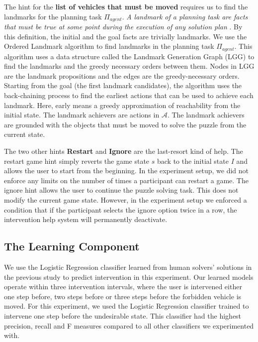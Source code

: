 The hint for the \textbf{list of vehicles that must be moved} requires us to find the landmarks for the planning task $\Pi_{agent}$. \textit{A landmark of a planning task are facts that must be true at some point during the execution of any solution plan} \cite{hoffman2004lm}. By this definition, the initial and the goal facts are trivially landmarks. We use the Ordered Landmark algorithm  to find landmarks in the planning task $\Pi_{agent}$. This algorithm uses a data structure called the Landmark Generation Graph (LGG) to find the landmarks and the greedy necessary orders between them. Nodes in LGG are the landmark propositions and the edges are the greedy-necessary orders. Starting from the goal (the first landmark candidates), the algorithm uses the back-chaining process to find the earliest actions that can be used to achieve each landmark. Here, early means a greedy approximation of reachability from the initial state. The landmark achievers are actions in $\mathcal{A}$. The landmark achievers are grounded with the objects that must be moved to solve the puzzle from the current state.

The two other hints \textbf{Restart} and \textbf{Ignore} are the last-resort kind of help. The restart game hint simply reverts the game state $s$ back to the initial state $I$ and allows the user to start from the beginning. In the experiment setup, we did not enforce any limits on the number of times a participant can restart a game. The ignore hint allows the user to continue the puzzle solving task. This does not modify the current game state. However, in the experiment setup we enforced a condition that if the participant selects the ignore option twice in a row, the intervention help system will permanently deactivate.

\subsection*{The Learning Component}
We use the Logistic Regression classifier learned from human solvers' solutions in the previous study to predict intervention in this experiment. Our learned models operate within three intervention intervals, where the user is intervened either one step before, two steps before or three steps before the forbidden vehicle is moved. For this experiment, we used the Logistic Regression classifier trained to intervene one step before the undesirable state. This classifier had the highest precision, recall and F measures compared to all other classifiers we experimented with.

